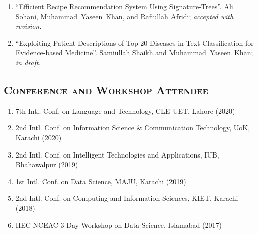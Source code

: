 \documentclass[a4paper, 10pt]{article}
\begin{document}
\begin{enumerate}
	\item ``Efficient Recipe Recommendation System Using Signature-Trees''. Ali Sohani, \textcolor{NavyBlue}{Muhammad~Yaseen~Khan}, and Rafiullah Afridi; 
	\emph{\small accepted with revision.}
	
	
	\item ``Exploiting Patient Descriptions of Top-20 Diseases in Text Classification for Evidence-based Medicine''. Samiullah Shaikh and \textcolor{NavyBlue}{Muhammad~Yaseen~Khan}; \emph{\small in draft.}
	


\end{enumerate}


\subsection*{\normalfont\textsc{Conference and Workshop Attendee}}
\begin{enumerate}
\itemsep-4pt
\item 7th Intl. Conf. on Language and Technology, CLE-UET, Lahore (2020)
\item 2nd Intl. Conf. on Information Science \& Communication Technology, UoK, Karachi (2020)
\item 2nd Intl. Conf. on Intelligent Technologies and Applications, IUB, Bhahawalpur (2019)
\item 1st Intl. Conf. on Data Science, MAJU, Karachi (2019)
\item 2nd Intl. Conf. on Computing and Information Sciences, KIET, Karachi (2018)
\item HEC-NCEAC 3-Day Workshop on Data Science, Islamabad (2017) 
\end{enumerate}
\end{document}
